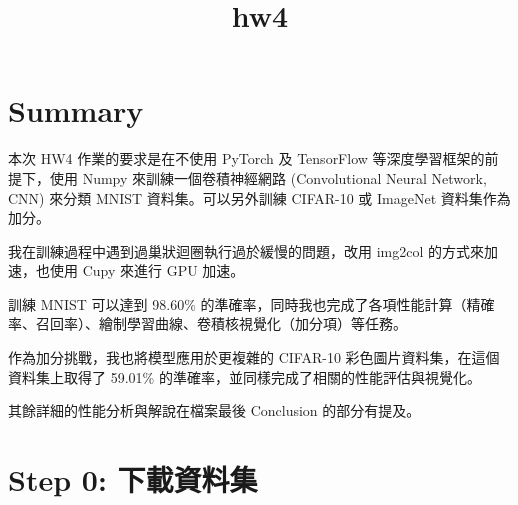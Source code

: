 \documentclass[11pt]{article}
\title{hw4}
\begin{document}
    
    \maketitle
    
    

    
    \section{Summary}\label{summary}

    本次 HW4 作業的要求是在不使用 PyTorch 及 TensorFlow
等深度學習框架的前提下，使用 Numpy 來訓練一個卷積神經網路 (Convolutional
Neural Network, CNN) 來分類 MNIST 資料集。可以另外訓練 CIFAR-10 或
ImageNet 資料集作為加分。

我在訓練過程中遇到過巢狀迴圈執行過於緩慢的問題，改用 img2col
的方式來加速，也使用 Cupy 來進行 GPU 加速。

訓練 MNIST 可以達到 98.60\%
的準確率，同時我也完成了各項性能計算（精確率、召回率）、繪制學習曲線、卷積核視覺化（加分項）等任務。

作為加分挑戰，我也將模型應用於更複雜的 CIFAR-10
彩色圖片資料集，在這個資料集上取得了 59.01\%
的準確率，並同樣完成了相關的性能評估與視覺化。

其餘詳細的性能分析與解說在檔案最後 Conclusion 的部分有提及。

    \section{Step 0:
下載資料集}\label{step-0-ux4e0bux8f09ux8cc7ux6599ux96c6}
\end{document}
